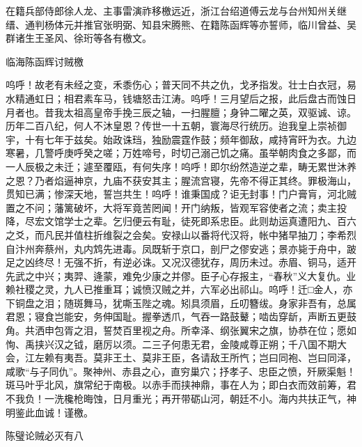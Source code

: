\documentclass[]{article}
\begin{document}
在籍兵部侍郎徐人龙、主事雷演祚移檄远近，浙江台绍道傅云龙与台州知州关继缙、通判杨体元并推官张明弼、知县宋腾熊、在籍陈函辉等亦誓师，临川曾益、吴群诸生王圣风、徐珩等各有檄文。

临海陈函辉讨贼檄

呜呼！故老有未经之变，禾黍伤心；普天同不共之仇，戈矛指发。壮士白衣冠，易水精通虹日；相君素车马，钱塘怒击江涛。呜呼！三月望后之报，此后盘古而蚀日月者也。昔我太祖高皇帝手挽三辰之轴，一扫腥膻；身钟二曜之英，双驱诚、谅。历年二百八纪，何人不沐皇恩？传世一十五朝，寰海尽行统历。迨我皇上崇祯御宇，十有七年于兹矣。始政诛珰，独励震霆作鼓；频年御敌，咸持宵旰为衣。九边寒暑，几警呼庚呼癸之嗟；万姓啼号，时切己溺己饥之痛。虽举朝肉食之多鄙，而一人辰极之未迁；遽至覆瓯，有何失序！呜呼！即尔纷然造逆之辈，畴无累世沐养之恩？乃者焰逼神京，九庙不获安其主；腥流宫寝，先帝不得正其终。罪极海山，贯知已满；惨深天地，誓岂共生！呜呼！谁秉国成？讵无封事！门户膏肓，河北贼置之不问；藩篱破坏，大将军竟苦罔闻！开门纳叛，皆观军容使者之流；卖主投降，尽宏文馆学士之辈。乞归便云有耻，徒死即系忠臣。此则劫运真遭阳九、百六之爻，而凡民并值柱折维裂之会矣。安禄山以番将代汉将，帐中猪早抽刀；李希烈自汴州奔蔡州，丸内鸩先进毒。凤既斩于京口，剖尸之僇安逃；景亦毙于舟中，跛足之凶终尽！无强不折，有逆必诛。又况汉德犹存，周历未过。赤眉、铜马，适开先武之中兴；夷羿、逄蒙，难免少康之并僇。臣子心存报主，``春秋''义大复仇。业赖社稷之灵，九人已推重耳；诚愤汉贼之并，六军必出祁山。呜呼！迁□金人，亦下铜盘之泪；随斑舞马，犹嘶玉陛之魂。矧具须眉，丘叨簪绂。身家非吾有，总属君恩；寝食岂能安，务伸国耻。握拳透爪，气吞一路鼓鼙；啮齿穿龂，声断五更鼓角。共洒申包胥之泪，誓焚百里视之舟。所幸泽、纲张翼宋之旗，协恭在位；愿如恂、禹挟兴汉之钺，磨厉以须。二三子何患无君，金陵咸尊正朔；千八国不期大会，江左赖有夷吾。莫非王土、莫非王臣，各请敌王所忾；岂曰同袍、岂曰同泽，咸歌``与子同仇''。聚神州、赤县之心，直穷巢穴；抒孝子、忠臣之愤，歼厥渠魁！斑马叶乎北风，旗常纪于南极。以赤手而挟神鼎，事在人为；即白衣而效前筹，君不我负！一洗欃枪晦蚀，日月重光；再开带砺山河，朝廷不小。海内共扶正气，神明鉴此血诚！谨檄。

陈璧论贼必灭有八
\end{document}
